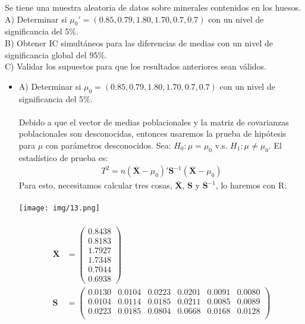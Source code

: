 \begin{problem}{3}
Se tiene una muestra aleatoria de datos sobre minerales contenidos en los huesos. \\
A) Determinar si $\mu_0'=(0.85,0.79,1.80,1.70,0.7,0.7)$ con un nivel de significancia del 5\%.\\
B) Obtener IC simultáneos para las diferencias de medias con un nivel de significancia global del 95\%.\\
C) Validar los supuestos para que los resultados anteriores sean válidos. 
\end{problem}

\begin{sol}
\begin{itemize}
\item A) Determinar si $\mu_0=(0.85,0.79,1.80,1.70,0.7,0.7)$ con un nivel de significancia del 5\%.\\\\
Debido a que el vector de medias poblacionales y la matriz de covarianzas poblacionales son desconocidas, entonces usaremos la prueba de hipótesis para $\mu$ con parámetros desconocidos. Sea:
$H_0:\mu = \mu_0 $ v.s. $H_1:\mu \neq \mu_0$.
El estadístico de prueba es:
\begin{align*}
T^2=n(\bar{\mathbf{X}} - \mu_0)'\mathbf{S}^{-1}(\mathbf{\bar{X}}-\mu_0)
\end{align*}
Para esto, necesitamos calcular tres cosas, $\mathbf{\bar{X}}$, $\mathbf{S}$ y $\mathbf{S}^{-1}$, lo haremos con R:\\\\
\texttt{[image: img/13.png]}\\\\
\begin{align*}
    \mathbf{\bar{X}}&= \begin{pmatrix} 0.8438 \\ 0.8183 \\ 1.7927 \\ 1.7348 \\ 0.7044 \\ 0.6938 \end{pmatrix} \\
    \mathbf{S} &= \begin{pmatrix}
        0.0130 & 0.0104 & 0.0223 & 0.0201 & 0.0091 & 0.0080 \\
        0.0104 & 0.0114 & 0.0185 & 0.0211 & 0.0085 & 0.0089 \\
        0.0223 & 0.0185 & 0.0804 & 0.0668 & 0.0168 & 0.0128 \\

\end{pmatrix}
\end{align*}
\end{itemize}
\end{sol}
